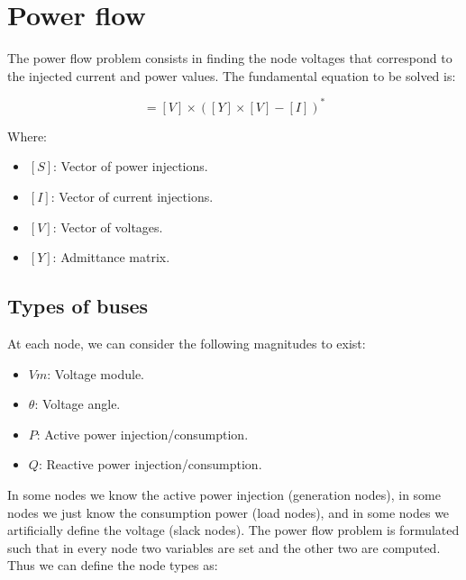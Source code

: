\documentclass[nols,a4paper,twoside,notoc,fleqn]{tufte-book}
\begin{document}
\chapter{Power flow} \label{ch:power_flow}

The power flow problem consists in finding the node voltages that correspond to the injected current and power values. The fundamental equation to be solved is:

\begin{equation}
[S] = [V] \times \left([Y] \times [V] - [I] \right)^*
\label{eq:power_flow}
\end{equation}


Where:

\begin{itemize}
\item $[S]$: Vector of power injections.
\item $[I]$: Vector of current injections.
\item $[V]$: Vector of voltages.
\item $[Y]$: Admittance matrix.
\end{itemize}


\section{Types of buses}

At each node, we can consider the following magnitudes to exist:
\begin{itemize}
	\item $Vm$: Voltage module.
	\item $\theta$: Voltage angle.
	\item $P$: Active power injection/consumption.
	\item $Q$: Reactive power injection/consumption.
\end{itemize}

In some nodes we know the active power injection (generation nodes), in some nodes we just know the consumption power (load nodes), and in some nodes we artificially define the voltage (slack nodes). The power flow problem is formulated such that in every node two variables are set and the other two are computed. Thus we can define the node types as:
\end{document}
